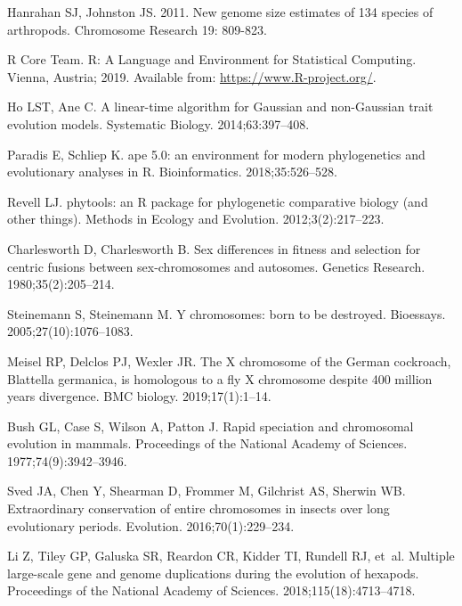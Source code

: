 \documentclass[]{rsos}%
\begin{document}
\begin{thebibliography}{99}
Hanrahan SJ, Johnston JS. 2011. 
New genome size estimates of 134 species of arthropods. Chromosome Research 19: 809-823.

{R Core Team}. R: A Language and Environment for Statistical Computing.
 Vienna, Austria; 2019.
 Available from: \url{https://www.R-project.org/}.
 
Ho LST, Ane C.
 A linear-time algorithm for Gaussian and non-Gaussian trait evolution
  models.
 Systematic Biology. 2014;63:397--408.

Paradis E, Schliep K.
 ape 5.0: an environment for modern phylogenetics and evolutionary
  analyses in {R}.
 Bioinformatics. 2018;35:526--528.

Revell LJ.
 phytools: an R package for phylogenetic comparative biology (and
  other things).
 Methods in Ecology and Evolution. 2012;3(2):217--223.

Charlesworth D, Charlesworth B.
 Sex differences in fitness and selection for centric fusions between
  sex-chromosomes and autosomes.
 Genetics Research. 1980;35(2):205--214.

Steinemann S, Steinemann M.
 Y chromosomes: born to be destroyed.
 Bioessays. 2005;27(10):1076--1083.

Meisel RP, Delclos PJ, Wexler JR.
 The X chromosome of the German cockroach, Blattella germanica, is
  homologous to a fly X chromosome despite 400 million years divergence.
 BMC biology. 2019;17(1):1--14.

Bush GL, Case S, Wilson A, Patton J.
 Rapid speciation and chromosomal evolution in mammals.
 Proceedings of the National Academy of Sciences.
  1977;74(9):3942--3946.

Sved JA, Chen Y, Shearman D, Frommer M, Gilchrist AS, Sherwin WB.
 Extraordinary conservation of entire chromosomes in insects over long
  evolutionary periods.
 Evolution. 2016;70(1):229--234.
 
Li Z, Tiley GP, Galuska SR, Reardon CR, Kidder TI, Rundell RJ, et~al.
Multiple large-scale gene and genome duplications during the evolution of hexapods.
Proceedings of the National Academy of Sciences.
2018;115(18):4713--4718.



\end{thebibliography}
\end{document}
